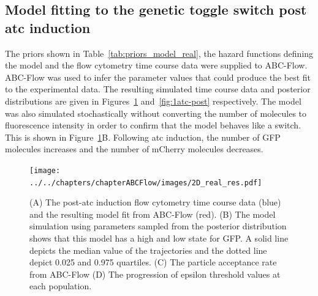 \subsection{Model fitting to the genetic toggle switch post \acrshort{atc} induction}

The priors shown in Table~\ref{tab:priors_model_real}, the hazard functions defining the model and the flow cytometry time course data were supplied to ABC-Flow. ABC-Flow was used to infer the parameter values that could produce the best fit to the experimental data. The resulting simulated time course data and posterior distributions are given in Figures~\ref{fig:1d-real-res} and~\ref{fig:1atc-post} respectively. The model was also simulated stochastically without converting the number of molecules to fluorescence intensity in order to confirm that the model behaves like a switch. This is shown in Figure~\ref{fig:1d-real-res}B. Following \acrshort{atc} induction, the number of GFP molecules increases and the number of mCherry molecules decreases. 


\begin{figure}[tb]
\centerfloat
	\texttt{[image: ../../chapters/chapterABCFlow/images/2D\_real\_res.pdf]}
	\caption[ABC-Flow fit to post-\acrshort{atc} time course data]{\label{fig:1d-real-res} (A) The post-\acrshort{atc} induction flow cytometry time course data (blue) and the resulting model fit from ABC-Flow (red). (B) The model simulation using parameters sampled from the posterior distribution shows that this model has a high and low state for GFP. A solid line depicts the median value of the trajectories and the dotted line depict 0.025 and 0.975 quartiles. (C) The particle acceptance rate from ABC-Flow (D) The progression of epsilon threshold values at each population.}
\end{figure}



